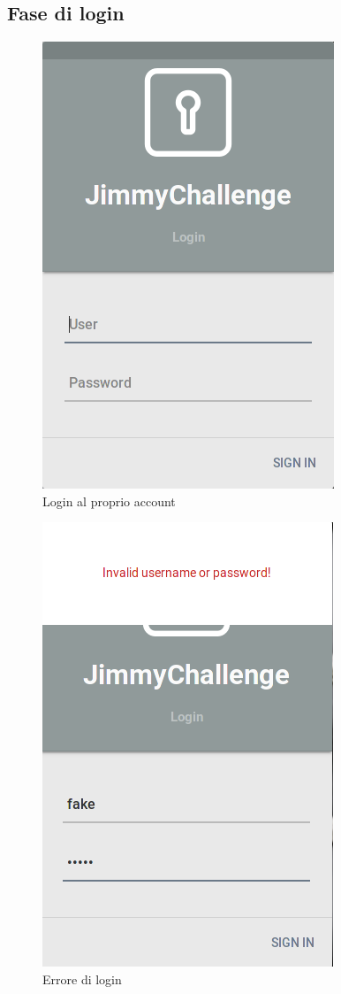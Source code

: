 \subsection{Fase di login}
\begin{figure}[!ht]
	\centering
	\includegraphics[scale=.3]{img/testing/login.png}
	\caption{Login al proprio account}
\end{figure}

\begin{figure}[!ht]
	\centering
	\includegraphics[scale=.3]{img/testing/login_error.png}
	\caption{Errore di login}
\end{figure}

